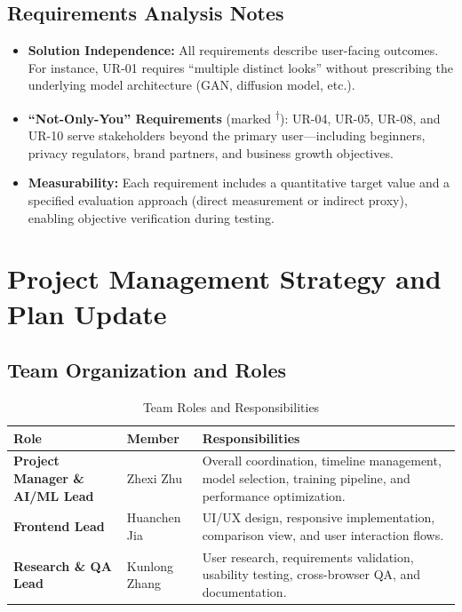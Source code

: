 \documentclass[11pt, letterpaper]{article}
\begin{document}
\subsection{Requirements Analysis Notes}
\begin{itemize}[leftmargin=*]
    \item \textbf{Solution Independence:} All requirements describe user-facing outcomes. For instance, UR-01 requires ``multiple distinct looks'' without prescribing the underlying model architecture (GAN, diffusion model, etc.).
    \item \textbf{``Not-Only-You'' Requirements} (marked \textsuperscript{$\dagger$}): UR-04, UR-05, UR-08, and UR-10 serve stakeholders beyond the primary user---including beginners, privacy regulators, brand partners, and business growth objectives.
    \item \textbf{Measurability:} Each requirement includes a quantitative target value and a specified evaluation approach (direct measurement or indirect proxy), enabling objective verification during testing.
\end{itemize}

\newpage
\section{Project Management Strategy and Plan Update}

\subsection{Team Organization and Roles}

\begin{table}[H]
\centering
\caption{Team Roles and Responsibilities}
\begin{tabularx}{\textwidth}{>{\bfseries}p{3cm} p{3cm} X}
\toprule
\textbf{Role} & \textbf{Member} & \textbf{Responsibilities} \\
\midrule
Project Manager \& AI/ML Lead & Zhexi Zhu & Overall coordination, timeline management, model selection, training pipeline, and performance optimization. \\
\addlinespace
Frontend Lead & Huanchen Jia & UI/UX design, responsive implementation, comparison view, and user interaction flows. \\
\addlinespace
Research \& QA Lead & Kunlong Zhang & User research, requirements validation, usability testing, cross-browser QA, and documentation. \\
\bottomrule
\end{tabularx}
\end{table}
\end{document}
